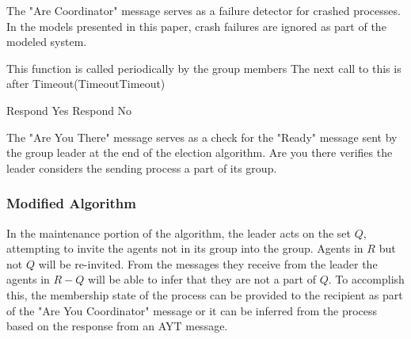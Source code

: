 The "Are Coordinator" message serves as a failure detector for crashed processes. In the models presented in this paper, crash failures are ignored as part of the modeled system.

\begin{algorithmic}[1]
\small
{}
    \State This function is called periodically by the group members
        \Return
    \Else
        \EndIf
    \EndIf
    \State The next call to this is after Timeout(TimeoutTimeout)
\EndFunction

\State

        \State Respond Yes
    \Else
        \State Respond No
    \EndIf
\EndFunction

\end{algorithmic}

The "Are You There" message serves as a check for the "Ready" message sent by the group leader at the end of the election algorithm. Are you there verifies the leader considers the sending process a part of its group.

\subsubsection{Modified Algorithm}
In the maintenance portion of the algorithm, the leader acts on the set $Q$, attempting to invite the agents not in its group into the group. Agents in $R$ but not $Q$ will be re-invited. From the messages they receive from the leader the agents in $R-Q$ will be able to infer that they are not a part of $Q$. To accomplish this, the membership state of the process can be provided to the recipient as part of the "Are You Coordinator" message or it can be inferred from the process based on the response from an AYT message.

